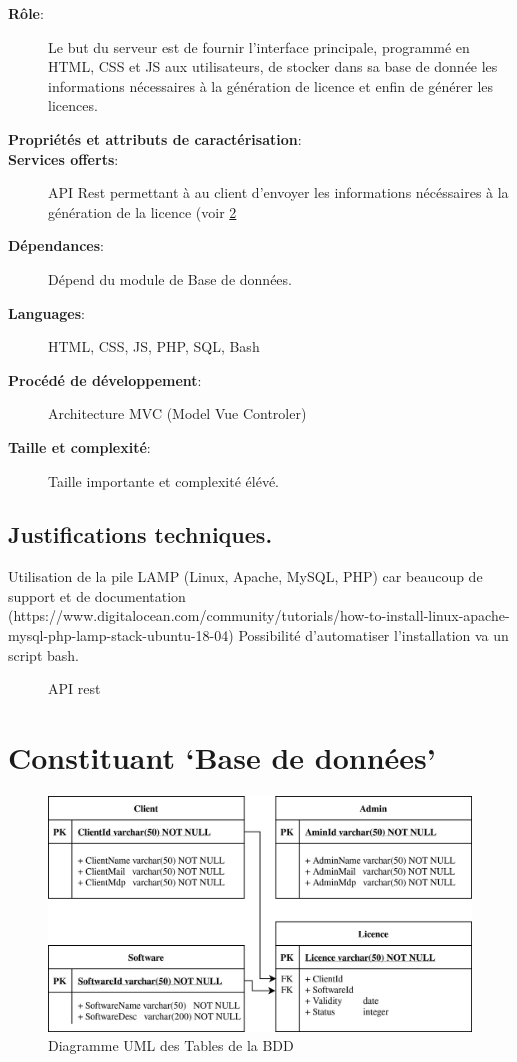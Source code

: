 \begin{description}
	\item[\textbf{Rôle}:]
				Le but du serveur est de fournir l'interface principale, programmé 
				en HTML, CSS et JS aux utilisateurs, de stocker dans sa base de donnée
				les informations nécessaires à la génération de licence et enfin de générer 
				les licences.
	\item[\textbf{Propriétés et attributs de caractérisation}:]
	\item[\textbf{Services offerts}:]
				API Rest permettant à au client d'envoyer les informations
				nécéssaires à la génération de la licence (voir \ref{fig:fig2} 				
	\item[\textbf{Dépendances}:]
				Dépend du module de Base de données.
	\item[\textbf{Languages}:]
				HTML, CSS, JS, PHP, SQL, Bash 
	\item[\textbf{Procédé de développement}:]
				Architecture MVC (Model Vue Controler)
	\item[\textbf{Taille et complexité}:]
				Taille importante et complexité élévé.
\end{description}

\subsection{Justifications techniques.}
Utilisation de la pile LAMP (Linux, Apache, MySQL, PHP) car beaucoup de 
support et de documentation (https://www.digitalocean.com/community/tutorials/how-to-install-linux-apache-mysql-php-lamp-stack-ubuntu-18-04)\newline
Possibilité d'automatiser l'installation va un script bash.

\begin{figure}[hp!]
	\caption{API rest}
	
	\label{fig:fig2}
\end{figure}
\newpage

\section{Constituant `Base de données'}

\begin{figure}[h!]
	\centering
	\includegraphics[width=\textwidth]{../png/SQL_table.png}
	\caption{Diagramme UML des Tables de la BDD}
	\label{fig:fig2}
\end{figure}

